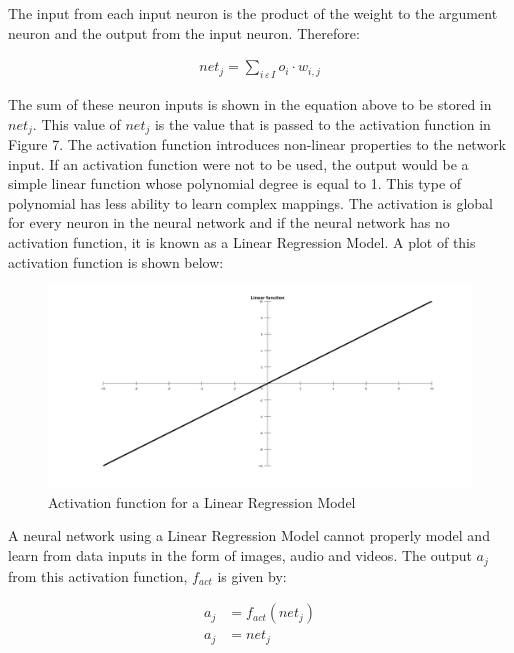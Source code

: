 	
The input from each input neuron is the product of the weight to the argument neuron and the output from the input neuron. Therefore:

\begin{align}
	net_j = \sum_{i\, \varepsilon \, I} o_{i} \cdot w_{i,j}
\end{align}

The sum of these neuron inputs is shown in the equation above to be stored in $net_j$. This value of  $net_j$ is the value that is passed to the activation function in Figure 7. The activation function introduces non-linear properties to the network input. If an activation function were not to be used, the output would be a simple linear function whose polynomial degree is equal to 1. This type of polynomial has less ability to learn complex mappings. The activation is global for every neuron in the neural network and if the neural network has no activation function, it is known as a Linear Regression Model. A plot of this activation function is shown below:

\begin{figure}[h]
	\centering
	\includegraphics[scale=1]{8}
	\caption{Activation function for a Linear Regression Model}
\end{figure}

A neural network using a Linear Regression Model cannot properly model and learn from data inputs in the form of images, audio and videos. The output $a_j$ from this activation function, $f_{act}$ is given by:

\begin{align}
	a_j &= f_{act} (net_j) \nonumber \\
	a_j &= net_j
\end{align}

